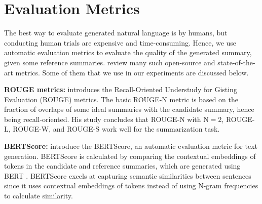 \section{Evaluation Metrics}
	\label{sec:metrics}

	The best way to evaluate generated natural language is by humans, but conducting
	human trials are expensive and time-consuming.
	Hence, we use automatic evaluation metrics to evaluate the quality of the generated
	summary, given some reference summaries.
	\citet{fabbri2021summeval} review many such open-source and state-of-the-art metrics.
	Some of them that we use in our experiments are discussed below.

	\textbf{ROUGE metrics:} \citet{lin-2004-rouge} introduces the Recall-Oriented Understudy
	for Gisting Evaluation (ROUGE) metrics.
	The basic ROUGE-N metric is based on the fraction of overlaps of some ideal summaries
	with the candidate summary, hence being recall-oriented.
	His study concludes that ROUGE-N with $\text{N} = 2$, ROUGE-L, ROUGE-W, and ROUGE-S work
	well for the summarization task.

	\textbf{BERTScore:} \citet{zhang2019bertscore} introduce the BERTScore, an automatic
	evaluation metric for text generation.
	BERTScore is calculated by comparing the contextual embeddings of tokens in the candidate
	and reference summaries, which are generated using BERT \cite{devlin2018bert}.
	BERTScore excels at capturing semantic similarities between sentences since it uses
	contextual embeddings of tokens instead of using N-gram frequencies to calculate similarity.

